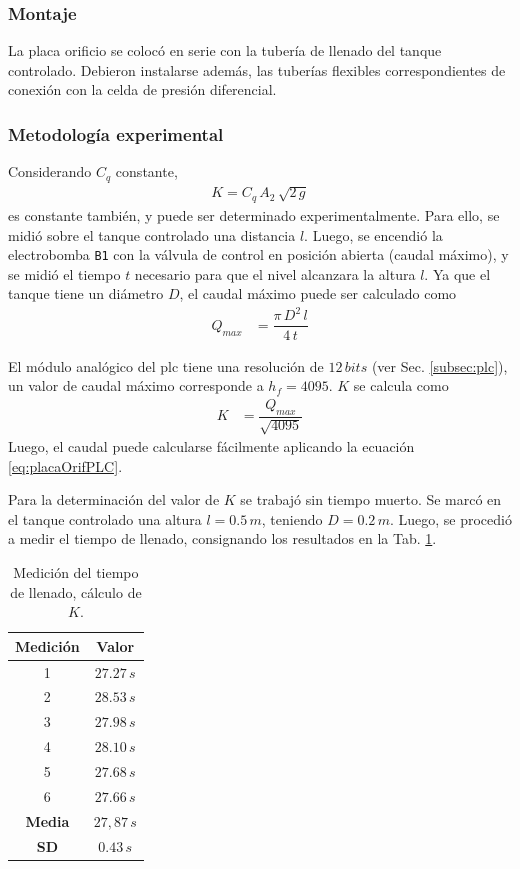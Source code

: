 \subsubsection{Montaje}
La placa orificio se colocó en serie con la tubería de llenado del
tanque controlado.
Debieron instalarse además, las tuberías flexibles correspondientes de conexión
con la celda de presión diferencial.

\subsubsection{Metodología experimental}
Considerando $C_q$ constante,
\begin{align}
 K = C_q\, A_2\, \sqrt{2\,g}
\end{align}
es constante también, y puede ser determinado experimentalmente.
Para ello, se midió sobre el tanque controlado una distancia $l$.
Luego, se encendió la electrobomba \verb|B1| con la válvula de control en
posición
abierta (caudal máximo), y se midió el tiempo $t$ necesario para que el nivel
alcanzara la altura $l$.
Ya que el tanque tiene un diámetro $D$, el caudal máximo puede ser
calculado como
\begin{align}
 Q_{max} &= \dfrac{\pi\,D^2\,l}{4\,t}
\end{align}

El módulo analógico del \gls{plc} tiene una resolución de $12\,bits$
(ver Sec. \ref{subsec:plc}), un valor de caudal máximo corresponde a $h_f =
4095$.
$K$ se calcula como
\begin{align}
 K &= \dfrac{Q_{max}}{\sqrt{4095}}
\end{align}
Luego, el caudal puede calcularse fácilmente aplicando la ecuación
\eqref{eq:placaOrifPLC}.

Para la determinación del valor de $K$ se trabajó sin tiempo muerto.
Se marcó en el tanque controlado una altura $l=0.5\,m$, teniendo $D=0.2\,m$.
Luego, se procedió a medir el tiempo de llenado, consignando los resultados en
la Tab. \ref{tab:tiempoK}.

\begin{table}[ht]
\renewcommand{\arraystretch}{1.3}
  \centering
  \bgroup
  \begin{tabular}{|c|c|}
  \hline
  Medición & Valor\\
  \hline
  1 & $27.27\,s$ \\
  2 & $28.53\,s$ \\
  3 & $27.98\,s$ \\
  4 & $28.10\,s$ \\
  5 & $27.68\,s$ \\
  6 & $27.66\,s$ \\
  \hline
  \hline
  \textbf{Media} & $27,87\,s$\\
  \textbf{SD} & $0.43\,s$\\
  \hline
  \end{tabular}
  \egroup
  \caption{Medición del tiempo de llenado, cálculo de $K$.}
  \label{tab:tiempoK}
\end{table}

